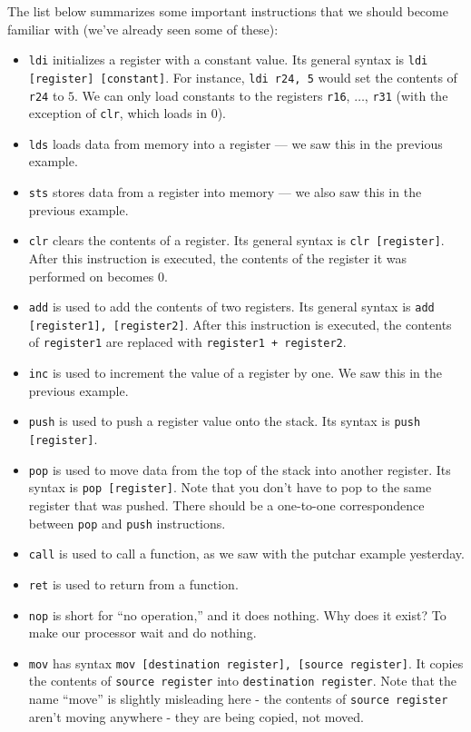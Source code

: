 The list below summarizes some important instructions that we should become familiar with (we've already seen some of these): \begin{itemize}
    \item \verb!ldi! initializes a register with a constant value. Its general syntax is \verb!ldi [register] [constant]!. For instance, \verb!ldi r24, 5! would set the contents of \verb!r24! to $5$. We can only load constants to the registers \verb!r16!, $\ldots$, \verb!r31! (with the exception of \verb!clr!, which loads in $0$).  
    \item \verb!lds! loads data from memory into a register --- we saw this in the previous example.
    \item \verb!sts! stores data from a register into memory --- we also saw this in the previous example.
    \item \verb!clr! clears the contents of a register. Its general syntax is \verb!clr [register]!. After this instruction is executed, the contents of the register it was performed on becomes $0$.
    \item \verb!add! is used to add the contents of two registers. Its general syntax is \verb!add [register1], [register2]!. After this instruction is executed, the contents of \verb!register1! are replaced with \verb!register1 + register2!. 
    \item \verb!inc! is used to increment the value of a register by one. We saw this in the previous example. 
    \item \verb!push! is used to push a register value onto the stack. Its syntax is \verb!push [register]!. 
    \item \verb!pop! is used to move data from the top of the stack into another register. Its syntax is \verb!pop [register]!. Note that you don't have to pop to the same register that was pushed. There should be a one-to-one correspondence between \verb!pop! and \verb!push! instructions.
    \item \verb!call! is used to call a function, as we saw with the putchar example yesterday.
    \item \verb!ret! is used to return from a function.
    \item \verb!nop! is short for ``no operation,'' and it does nothing. Why does it exist? To make our processor wait and do nothing.
    \item \verb!mov! has syntax \verb!mov [destination register], [source register]!. It copies the contents of \verb!source register! into \verb!destination register!. Note that the name ``move'' is slightly misleading here - the contents of \verb!source register! aren't moving anywhere - they are being copied, not moved.
\end{itemize}

